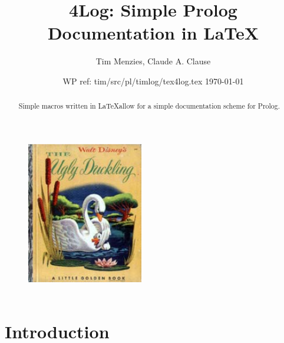 \documentclass[twocolumn,global]{tex4log/svjour}
\date{WP ref: tim/src/pl/timlog/tex4log.tex \today} %
\begin{document}
\title{\Tex4Log: Simple Prolog Documentation in \LaTeX }
\author{Tim Menzies, Claude A. Clause}

 \maketitle
%

\thispagestyle{empty}  %
\pagestyle{plain} %

\small

\begin{abstract}
Simple macros written in \LaTeX allow for a simple documentation
scheme for Prolog.
\end{abstract}


\begin{figure}
\begin{center}
\includegraphics[width=2in]{tex4log/ugly.eps}
\end{center}
\caption{~}\label{fig:ugly}
\end{figure}
\section{Introduction}
\end{document}
